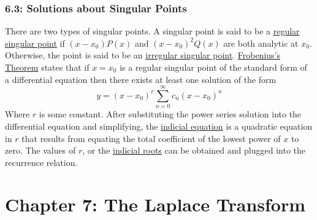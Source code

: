 \documentclass{article}
\begin{document}
\section*{6.3: Solutions about Singular Points}
There are two types of singular points. A singular point is said to be a \underline{regular singular point} if \((x-x_0)P(x)\) and \((x-x_0)^2Q(x)\) are both analytic at \(x_0\). Otherwise, the point is said to be an \underline{irregular singular point}.
\newline
\newline
\underline{Frobenius's Theorem} states that if \(x=x_0\) is a regular singular point of the standard form of a differential equation then there exists at least one solution of the form
\[y=(x-x_0)^r\sum_{n=0}^\infty c_n(x-x_0)^n\]
Where \(r\) is some constant. After substituting the power series solution into the differential equation and simplifying, the \underline{indicial equation} is a quadratic equation in \(r\) that results from equating the total coefficient of the lowest power of \(x\) to zero. The values of \(r\), or the \underline{indicial roots} can be obtained and plugged into the recurrence relation.
\part*{Chapter 7: The Laplace Transform}
\end{document}
